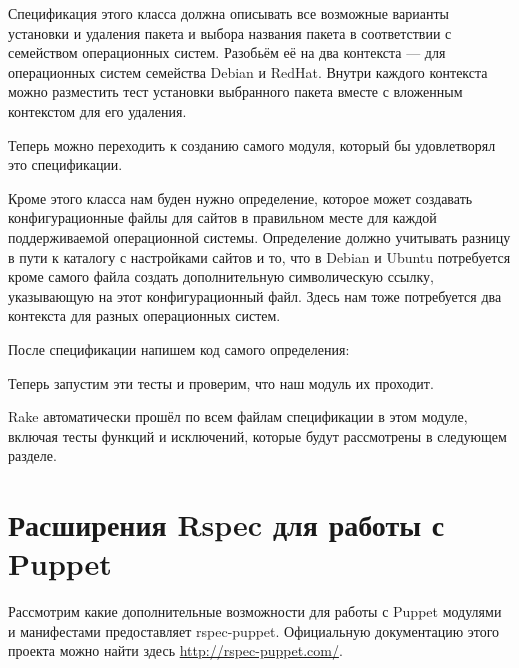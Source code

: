 Спецификация этого класса должна описывать все возможные варианты установки и удаления пакета и выбора названия пакета в соответствии с семейством операционных систем. Разобьём её на два контекста --- для операционных систем семейства Debian и RedHat. Внутри каждого контекста можно разместить тест установки выбранного пакета вместе с вложенным контекстом для его удаления.



Теперь можно переходить к созданию самого модуля, который бы удовлетворял это спецификации.



Кроме этого класса нам буден нужно определение, которое может создавать конфигурационные файлы для сайтов в правильном месте для каждой поддерживаемой операционной системы.
Определение должно учитывать разницу в пути к каталогу с настройками сайтов и то, что в Debian и Ubuntu потребуется кроме самого файла создать дополнительную символическую ссылку, указывающую на этот конфигурационный файл. Здесь нам тоже потребуется два контекста для разных операционных систем.



После спецификации напишем код самого определения:



Теперь запустим эти тесты и проверим, что наш модуль их проходит.



Rake автоматически прошёл по всем файлам спецификации в этом модуле, включая тесты функций и исключений, которые будут рассмотрены в следующем разделе.


\section{Расширения Rspec для работы с Puppet}

Рассмотрим какие дополнительные возможности для работы с Puppet модулями и манифестами предоставляет rspec-puppet. Официальную документацию этого проекта можно найти здесь \url{http://rspec-puppet.com/}.

